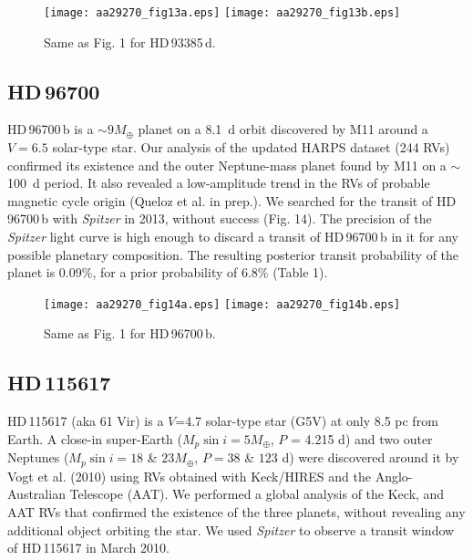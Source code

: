 \documentclass[traditabstract]{aa}
\begin{document}
\begin{figure}
\label{fig:14}
\centering                     
\texttt{[image: aa29270\_fig13a.eps]}
\texttt{[image: aa29270\_fig13b.eps]}
\caption{Same as Fig. 1 for  HD\,93385\,d.}
\end{figure}

\subsection{HD\,96700}

HD\,96700\,b is a $\sim 9 M_\oplus$ planet on a 8.1~d orbit discovered by M11 around a $V=6.5$ solar-type star. 
Our analysis of the updated HARPS dataset (244 RVs) confirmed its existence and  the outer Neptune-mass planet found by M11 on a $\sim$100~d period. It also revealed a low-amplitude trend in the RVs of probable magnetic cycle origin (Queloz et al. in prep.). We searched for the transit of HD\,96700\,b with {\it Spitzer} in 2013, without success (Fig. 14).
The precision of the {\it Spitzer} light curve  is high enough to discard a transit of HD\,96700\,b in it for any possible planetary composition. The resulting posterior transit probability of the planet is 0.09\%, for a prior probability of 6.8\% (Table 1). 

\begin{figure}
\label{fig:15}
\centering                     
\texttt{[image: aa29270\_fig14a.eps]}
\texttt{[image: aa29270\_fig14b.eps]}
\caption{Same as Fig. 1 for  HD\,96700\,b.}
\end{figure}

\subsection{HD\,115617}

HD\,115617 (aka 61 Vir) is a $V$=4.7 solar-type star (G5V) at only 8.5 pc from Earth. 
A close-in super-Earth ($M_p \sin i = 5 M_\oplus$, $P$ = 4.215 d) and two outer Neptunes ($M_p \sin i  = 
18$ \& $23 M_\oplus$, $P = 38$ \& $123$ d) were discovered around it by Vogt et al. (2010) using RVs obtained 
with Keck/HIRES and the Anglo-Australian Telescope (AAT). We performed a global analysis of the Keck, and AAT RVs that confirmed the existence of the three planets, without revealing any additional object orbiting the star. 
We used {\it Spitzer} to observe a transit window of HD\,115617 in March 2010.
\end{document}
